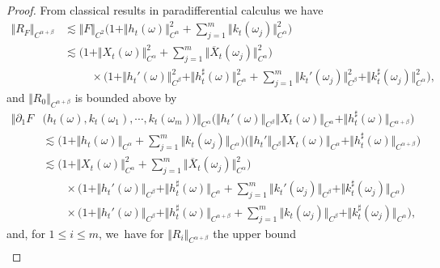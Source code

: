\documentclass[10pt]{amsart}
\theoremstyle{definition}
\newcommand{\norme}[1]{\Vert #1 \Vert}
\begin{document}
\begin{proof}
\begin{minipage}{\textwidth}
\end{minipage}
\par\smallskip\noindent
From classical results in paradifferential calculus we have
\begin{equation*} \begin{split}
\norme{R_F}_{C^{\alpha+\beta}} &\lesssim \norme{F}_{C^2}\bigl(1+\norme{h_t(\omega)}_{C^\alpha}^2+\textstyle\sum_{j=1}^m \norme{k_t(\omega_j)}^2_{C^\alpha}\bigr) \\
&\lesssim \bigl(1 + \norme{X_t(\omega)}^2_{C^\alpha} + \textstyle\sum_{j=1}^m\norme{\overline X_t(\omega_j)}^2_{C^\alpha}\bigr) \\
&\hspace{1cm}\times\bigl(1+\norme{h_t'(\omega)}_{C^\beta}^2 + \norme{h_t^\sharp(\omega)}_{C^\alpha}^2 + \textstyle\sum_{j=1}^m\norme{k_t'(\omega_j)}_{C^\beta}^2 + \norme{k_t^\sharp(\omega_j)}_{C^\alpha}^2\bigr),
\end{split} \end{equation*}
and $\norme{R_0}_{C^{\alpha+\beta}}$ is bounded above by
\begin{equation*} \begin{split}
\big\Vert\partial_1F&\bigl(h_t(\omega), k_t(\omega_1),\cdots, k_t(\omega_m)\bigr)\big\Vert_{C^\alpha}\bigl(\norme{h_t'(\omega)}_{C^\beta} \norme{X_t(\omega)}_{C^\alpha} + \norme{h_t^\sharp(\omega)}_{C^{\alpha+\beta}}\bigr) \\
&\lesssim \bigl(1+\norme{h_t(\omega)}_{C^\alpha} + \textstyle\sum_{j=1}^m\norme{k_t(\omega_j)}_{C^\alpha}\bigr)\bigl(\norme{h_t'}_{C^\beta}\norme{X_t(\omega)}_{C^\alpha} + \norme{h_t^\sharp(\omega)}_{C^{\alpha+\beta}}\bigr) \\
&\lesssim \bigl(1+\norme{X_t(\omega)}^2_{C^\alpha} + \textstyle\sum_{j=1}^m\norme{\overline{X}_t(\omega_j)}^2_{C^\alpha}\bigr) \\
&\qquad\times \bigl(1+\norme{h_t'(\omega)}_{C^\beta} + \norme{h_t^\sharp(\omega)}_{C^\alpha} + \textstyle\sum_{j=1}^m \norme{k_t'(\omega_j)}_{C^\beta} + \norme{k_t^\sharp(\omega_j)}_{C^\alpha} \bigr)
\\
&\qquad\times \bigl(1+ \norme{h_t'(\omega)}_{C^\beta} + \norme{h_t^\sharp(\omega)}_{C^{\alpha+\beta}} + \textstyle\sum_{j=1}^m \norme{k_t(\omega_j)}_{C^\beta} + \norme{k_t^\sharp(\omega_j)}_{C^\alpha}
\bigr),
\end{split} \end{equation*}
and, for $1\leq i\leq m$, we~have for $\norme{R_i}_{C^{\alpha+\beta}}$ the upper bound
\begin{align*}

\end{align*}
\end{proof}
\end{document}
